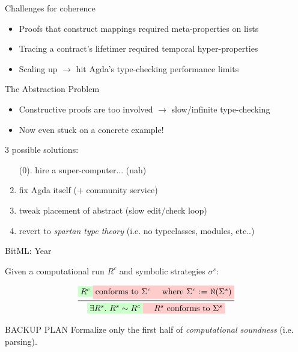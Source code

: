 \documentclass[aspectratio=169]{beamer}
\renewcommand\alert[1]{\textcolor{mLightBrown}{#1}}
\newcommand\IV{\textgoth{IV}\xspace}
\begin{document}
\begin{frame}{Challenges for coherence}
\begin{itemize}
\item Proofs that construct mappings required \alert{meta-properties} on lists
\item Tracing a contract's lifetimer required \alert{temporal hyper-properties}
\item Scaling up $\to$ hit Agda's \alert{type-checking performance} limits
\end{itemize}
\end{frame}

\begin{frame}{The Abstraction Problem}
\begin{itemize}
\item Constructive proofs are too involved $\to$ slow/infinite type-checking
\item Now even stuck on a concrete example!
\end{itemize}

3 possible solutions:
\begin{enumerate}
\item[(0).] hire a super-computer... (nah)
\item fix Agda itself (+ community service)
\item tweak placement of \alert{abstract} (slow edit/check loop)
\item revert to \textit{spartan type theory} (i.e. no typeclasses, modules, etc..)
\end{enumerate}
\end{frame}

\begin{frame}{BitML: Year \IV}

Given a computational run $R^c$ and symbolic strategies $\sigma^s$:

\[
\infer
  {\colorbox{green!20}{$\exists R^s. \ R^s \sim R^c$}
   \colorbox{red!20}{$\quad R^s$ conforms to $\Sigma^s$}}
  {\colorbox{green!20}{$R^c$} \colorbox{red!20}{conforms to $\Sigma^c \quad$
  where $\Sigma^c$ := $\aleph(\Sigma^s)$}}
\]

\begin{alertblock}{BACKUP PLAN}
Formalize only the first half of \textit{computational soundness} (i.e. \alert{parsing}).
\end{alertblock}
\end{frame}
\end{document}
